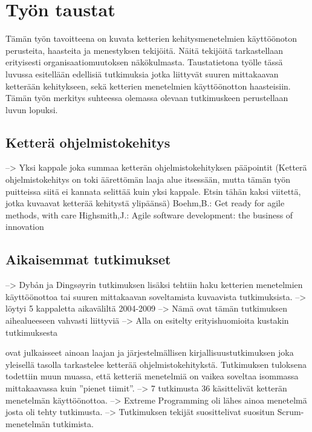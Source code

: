 
\section{Työn taustat}
\label{sec:tausta}

Tämän työn tavoitteena on kuvata ketterien kehitysmenetelmien käyttöönoton
perusteita, haasteita ja menestyksen tekijöitä. Näitä tekijöitä tarkastellaan
erityisesti organisaatiomuutoksen näkökulmasta. Taustatietona työlle tässä
luvussa esitellään edellisiä tutkimuksia jotka liittyvät suuren mittakaavan
ketterään kehitykseen, sekä ketterien menetelmien käyttöönotton haasteisiin.
Tämän työn merkitys suhteessa olemassa olevaan tutkimuskeen perustellaan luvun
lopuksi.

\subsection{Ketterä ohjelmistokehitys}
--> Yksi kappale joka summaa ketterän ohjelmistokehityksen pääpointit
(Ketterä ohjelmistokehitys on toki äärettömän laaja alue itsessään, mutta
tämän työn puitteissa siitä ei kannata selittää kuin yksi kappale. Etsin
tähän kaksi viitettä, jotka kuvaavat ketterää kehitystä ylipäänsä)
Boehm,B.: Get ready for agile methods, with care
Highsmith,J.: Agile software development: the business of innovation


\subsection{Aikaisemmat tutkimukset}

--> Dybån ja Dingsøyrin tutkimuksen lisäksi tehtiin haku ketterien menetelmien
käyttöönottoa tai suuren mittakaavan soveltamista kuvaavista tutkimuksista.
--> löytyi 5 kappaletta aikaväliltä 2004-2009
--> Nämä ovat tämän tutkimuksen aihealueeseen vahvasti liittyviä
--> Alla on esitelty erityishuomioita kustakin tutkimuksesta

 ovat julkaisseet ainoan laajan ja järjestelmällisen
kirjallisuustutkimuksen joka yleisellä tasolla tarkastelee ketterää
ohjelmistokehitykstä. Tutkimuksen tuloksena todettiin muun muassa, että ketteriä
menetelmiä on vaikea soveltaa isommassa mittakaavassa kuin ''pienet tiimit''.
--> 7 tutkimusta 36 käsittelivät ketterän menetelmän käyttöönottoa.
--> Extreme Programming oli lähes ainoa menetelmä josta oli tehty tutkimusta.
--> Tutkimuksen tekijät suosittelivat suositun Scrum-menetelmän tutkimista.

